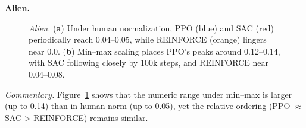 \noindent \textbf{Alien.}
\begin{figure} 
	\centering
	\quad
	\caption{\emph{Alien.} 
		(\textbf{a}) Under human normalization, PPO (blue) and SAC (red) periodically reach 0.04--0.05, while REINFORCE (orange) lingers near 0.0.
		(\textbf{b}) Min--max scaling places PPO’s peaks around 0.12--0.14, with SAC following closely by 100k steps, and REINFORCE near 0.04--0.08.}
	\label{fig:alien_combined}
\end{figure}

\noindent
\emph{Commentary.} Figure~\ref{fig:alien_combined} shows that the numeric range under min--max is larger (up to 0.14) than in human norm (up to 0.05), yet the relative ordering (PPO \(\approx\) SAC > REINFORCE) remains similar.

\medskip

